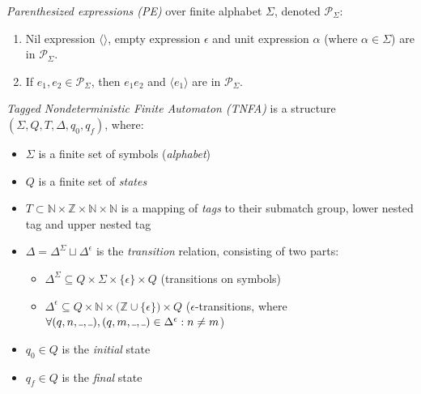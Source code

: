\documentclass[AMA,STIX1COL]{WileyNJD-v2}
\newcommand{\Xl}{\langle}
\newcommand{\Xr}{\rangle}
\newcommand{\Xm}{\langle\!\rangle}
\newcommand{\Xund}{\rule{.4em}{.4pt}}
\newcommand{\XP}{\mathcal{P}}
\newcommand{\YN}{\mathbb{N}}
\newcommand{\YZ}{\mathbb{Z}}
\begin{document}
    \begin{definition}
    \emph{Parenthesized expressions (PE)} over finite alphabet $\Sigma$, denoted $\XP_\Sigma$:
    \begin{enumerate}
        \item
            Nil expression $\Xm$,
            empty expression $\epsilon$ and
            unit expression $\alpha$ (where $\alpha \in \Sigma$)
            are in $\XP_\Sigma$.
        \item If $e_1, e_2 \in \XP_\Sigma$, then
            $e_1 e_2$ and
            $\Xl e_1 \Xr$
            are in $\XP_\Sigma$.
    \end{enumerate}
    \end{definition}


    \begin{definition}
    \emph{Tagged Nondeterministic Finite Automaton (TNFA)}
    is a structure $(\Sigma, Q, T, \Delta, q_0, q_f)$, where:
    \begin{itemize}
        \item[] $\Sigma$ is a finite set of symbols (\emph{alphabet})
        \item[] $Q$ is a finite set of \emph{states}
        \item[] $T \subset \YN \times \YZ \times \YN \times \YN$ is a mapping of \emph{tags} to their submatch group, lower nested tag and upper nested tag
        \item[] $\Delta = \Delta^\Sigma \sqcup \Delta^\epsilon$ is the \emph{transition} relation,
            consisting of two parts:
        \begin{itemize}
            \item[] $\Delta^\Sigma \subseteq Q \times \Sigma \times \{\epsilon\} \times Q$ (transitions on symbols)
            \item[] $\Delta^\epsilon \subseteq Q \times \YN \times \big( \YZ \cup \{\epsilon\} \big) \times Q$
                ($\epsilon$-transitions, where $\forall (q, n, \Xund, \Xund), (q, m, \Xund, \Xund) \in \Delta^\epsilon: n \neq m$)
        \end{itemize}
        \item[] $q_0 \in Q$ is the \emph{initial} state
        \item[] $q_f \in Q$ is the \emph{final} state
    \end{itemize}
    \end{definition}
\end{document}
